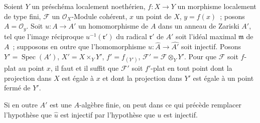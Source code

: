 \begin{corollary}[11.5.2]
\label{IV.11.5.2-fr}
Soient $Y$ un préschéma localement noethérien, $f:X\to Y$ un morphisme
localement de type fini, $\mathcal F$ un $\mathcal O_X$-Module cohérent, $x$ un
point de $X$, $y=f(x)$~; posons $A=\mathcal O_y$. Soit $u:A\to A'$ un
homomorphisme de $A$ dans un anneau de Zariski $A'$, tel que l'image réciproque
$u^{-1}(\mathfrak r')$ du radical $\mathfrak r'$ de $A'$ soit l'idéal maximal
$\mathfrak m$ de $A$~; supposons en outre que l'homomorphisme
$\widehat u:\widehat A\to\widehat{A'}$ soit injectif. Posons
$Y'=\operatorname{Spec}(A')$, $X'=X\times_Y Y'$, $f'=f_{(Y')}$,
$\mathcal F'=\mathcal F\otimes_Y Y'$. Pour que $\mathcal F$ soit $f$-plat au
point $x$, il faut et il suffit que $\mathcal F'$ soit $f'$-plat en tout point
dont la projection dans $X$ est égale à $x$ et dont la projection dans $Y'$ est
égale à un point fermé de $Y'$.

Si en outre $A'$ est une $A$-algèbre finie, on peut dans ce qui précède
remplacer l'hypothèse que $\widehat u$ est injectif par l'hypothèse que $u$ est
injectif.
\end{corollary}

